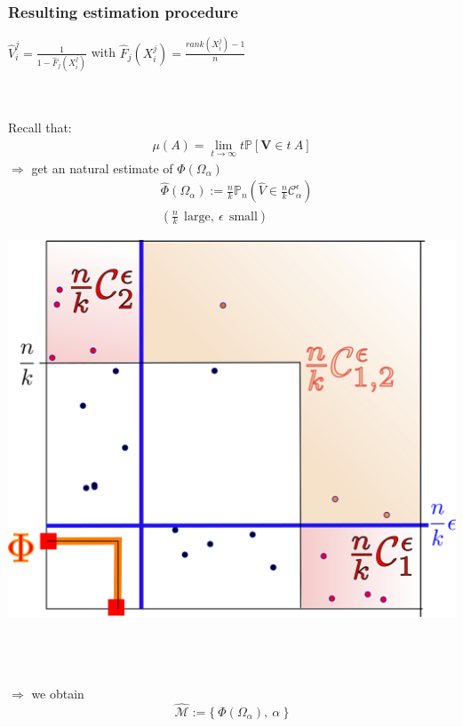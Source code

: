 \documentclass[9pt]{beamer}
\def\mb{\mathbf}
\begin{document}
\begin{frame}
\frametitle{Resulting estimation procedure}
$\hat V_i^j = \frac{1}{1- \hat F_j(X_{i}^j)}$ with 
$\hat F_j(X_{i}^j) =\frac{rank(X_i^j) -1}{n} $\\~\\~\\

\begin{minipage}{0.5\linewidth}
Recall that:
\begin{align*}
\mu(A)=\lim_{t \to \infty} t \mathbb{P}[\mb V\in t~A]
\end{align*}
%
$\Rightarrow$ get an natural estimate of $\Phi(\Omega_\alpha)$
\begin{align*}
&\widehat{\Phi}(\Omega_\alpha) := \frac{n}{k}\mathbb{P}_n( \hat V \in \frac{n}{k}\mathcal{C}_\alpha^\epsilon)\\
&(\frac{n}{k}~~ \text{large}, ~\epsilon~~ \text{small})
\end{align*}
\end{minipage}\hfill
\begin{minipage}{0.5\linewidth}
\centering
\includegraphics[scale=0.45]{sourcefigs/representation2D_nk_rect.png}
\end{minipage}
~\\~\\~\\
$\Rightarrow$ we obtain
$$\widehat{\mathcal{M}}:=\big\{~\widehat{\Phi}(\Omega_{\alpha}),~ \alpha~\big\}$$
\end{frame}
\end{document}
